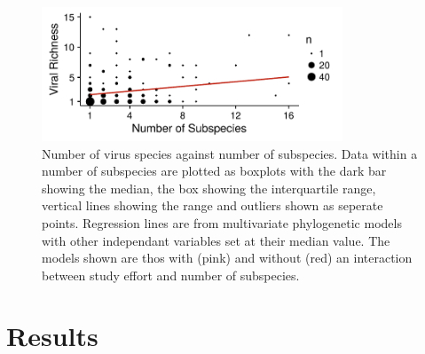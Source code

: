\begin{knitrout}\footnotesize
{}\color{fgcolor}\begin{figure}[t]

{\centering \includegraphics[width=0.8\textwidth]{figure/boxplot-1} 

}

\caption[Number of virus species against number of subspecies]{Number of virus species against number of subspecies. 
Data within a number of subspecies are plotted as boxplots with the dark bar showing the median, the box showing the interquartile range, vertical lines showing the range and outliers shown as seperate points.
Regression lines are from multivariate phylogenetic models with other independant variables set at their median value.
The models shown are thos with (pink) and without (red) an interaction between study effort and number of subspecies.
}\label{fig:boxplot}
\end{figure}


\end{knitrout}











\clearpage




















\clearpage
\section{Results}

